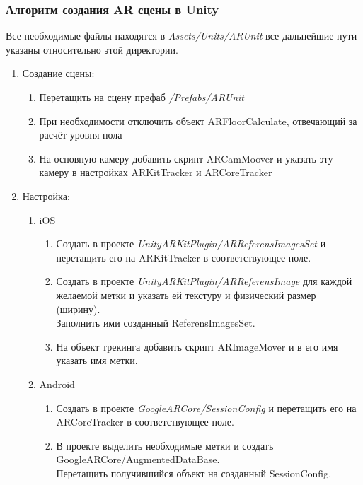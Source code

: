 \documentclass[a4paper, 11pt, titlepage]{article}
\begin{document}
      \subsubsection{Алгоритм создания AR сцены в Unity}
        Все необходимые файлы находятся в \textit{Assets/Units/ARUnit} все дальнейшие пути указаны относительно этой директории.
        \begin{enumerate}
          \item Создание сцены:
            \begin{enumerate}
              \item Перетащить на сцену префаб \textit{/Prefabs/ARUnit}
              \item При необходимости отключить объект ARFloorCalculate, отвечающий за расчёт уровня пола
              \item На основную камеру добавить скрипт ARCamMoover и указать эту камеру в настройках ARKitTracker и ARCoreTracker
            \end{enumerate}
            \item Настройка:
              \begin{enumerate}
                \item iOS
                \begin{enumerate}
                  \item Создать в проекте \textit{UnityARKitPlugin/ARReferensImagesSet} и перетащить его на ARKitTracker в соответствующее поле.
                  \item Создать в проекте \textit{UnityARKitPlugin/ARReferensImage} для каждой желаемой метки и указать ей текстуру и физический размер (ширину). \\
                    Заполнить ими созданный ReferensImagesSet.
                  \item На объект трекинга добавить скрипт ARImageMover и в его имя указать имя метки.
                \end{enumerate}
                \item Android
                  \begin{enumerate}
                  \item Создать в проекте \textit{GoogleARCore/SessionConfig} и перетащить его на ARCoreTracker в соответствующее поле.
                  \item В проекте выделить необходимые метки и создать GoogleARCore/AugmentedDataBase. \\
                    Перетащить получившийся объект на созданный SessionConfig.

\end{enumerate}
\end{enumerate}
\end{enumerate}
\end{document}
